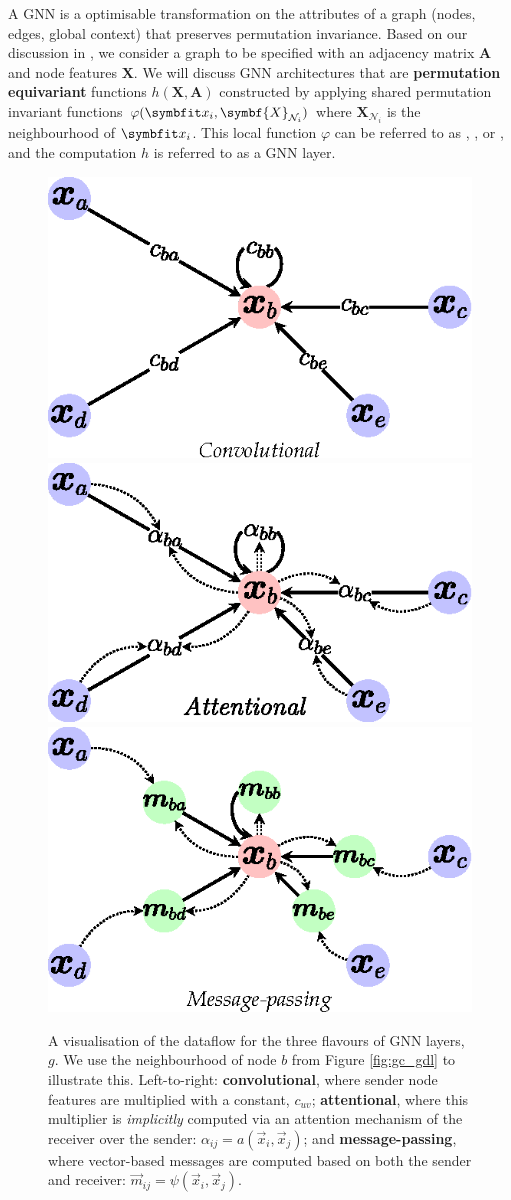 A GNN is a optimisable transformation on the attributes of a graph (nodes, edges, global context) that preserves permutation invariance.
Based on our discussion in , we consider a graph to be specified with an adjacency matrix $\symbf{A}$ and node features $\symbf{X}$. We will discuss GNN architectures that are \textbf{permutation equivariant} functions $h(\symbf{X}, \symbf{A})$ constructed by applying shared permutation invariant functions $\varphi(\bfitx_i, \symbf{X}_{\mathcal{N}_i})$ where $\symbf{X}_{\mathcal{N}_i}$ is the neighbourhood of $\bfitx_i$. This local function $\varphi$ can be referred to as , , or , and the computation $h$ is referred to as a GNN layer.

\begin{figure}
    \centering
    \includegraphics[width=0.33\linewidth]{chapters/assets/graph-figs/GNN_GDL_TYPES_C.eps}
    \hspace{-0.5em}
    \includegraphics[width=0.33\linewidth]{chapters/assets/graph-figs/GNN_GDL_TYPES_A.eps}
    \hspace{-0.5em}
    \includegraphics[width=0.33\linewidth]{chapters/assets/graph-figs/GNN_GDL_TYPES_MP.eps}
    \caption{A visualisation of the dataflow for the three flavours of GNN layers, $g$. We use the neighbourhood of node $b$ from Figure \ref{fig:gc_gdl} to illustrate this. Left-to-right: \textbf{convolutional}, where sender node features are multiplied with a constant, $c_{uv}$; \textbf{attentional}, where this multiplier is \emph{implicitly} computed via an attention mechanism of the receiver over the sender: $\alpha_{ij}=a(\vec{x}_i, \vec{x}_j)$; and \textbf{message-passing}, where vector-based messages are computed based on both the sender and receiver: $\vec{m}_{ij}=\psi(\vec{x}_i, \vec{x}_j)$.}
    \label{fig:gc_flavours}
\end{figure}%

